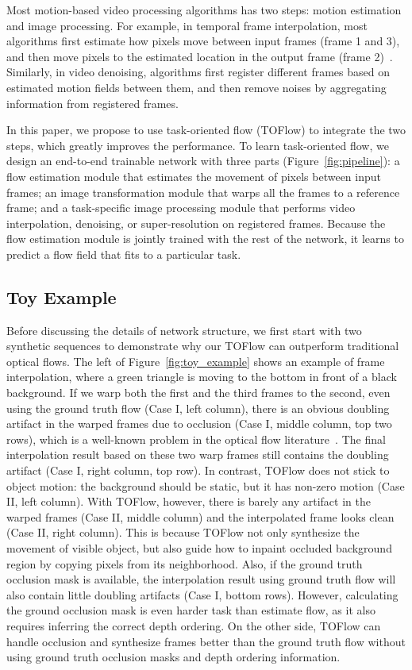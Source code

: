 \documentclass[twocolumn,natbib]{svjour3}          \smartqed  \usepackage{graphicx}
\newcommand{\fig}[1]{Figure~\ref{#1}}
\def\toflow{TOFlow\xspace}
\begin{document}
 
Most motion-based video processing algorithms has two steps: motion estimation and image processing.
For example, in temporal frame interpolation, most algorithms first estimate how pixels move between input frames (frame 1 and 3), and then move pixels to the estimated location in the output frame (frame 2)~\citep{baker2011database}. Similarly, in video denoising, algorithms first register different frames based on estimated motion fields between them, and then remove noises by aggregating information from registered frames.

In this paper, we propose to use task-oriented flow (TOFlow) to integrate the two steps, which greatly improves the performance. To learn task-oriented flow, we design an end-to-end trainable network with three parts (\fig{fig:pipeline}): a flow estimation module that estimates the movement of pixels between input frames; an image transformation module that warps all the frames to a reference frame; and a task-specific image processing module that performs video interpolation, denoising, or super-resolution on registered frames. Because the flow estimation module is jointly trained with the rest of the network, it learns to predict a flow field that fits to a particular task.

\subsection{Toy Example}
\label{sec:toy_exmaple}



Before discussing the details of network structure, we first start with two synthetic sequences to demonstrate why our \toflow can outperform traditional optical flows. The left of \fig{fig:toy_example} shows an example of frame interpolation, where a green triangle is moving to the bottom in front of a black background. If we warp both the first and the third frames to the second, even using the ground truth flow (Case I, left column), there is an obvious doubling artifact in the warped frames due to occlusion (Case I, middle column, top two rows), which is a well-known problem in the optical flow literature~\citep{baker2011database}. The final interpolation result based on these two warp frames still contains the doubling artifact (Case I, right column, top row). In contrast, \toflow does not stick to object motion: the background should be static, but it has non-zero motion (Case II, left column). With \toflow, however, there is barely any artifact in the warped frames (Case II, middle column) and the interpolated frame looks clean (Case II, right column). This is because \toflow not only synthesize the movement of visible object, but also guide how to inpaint occluded background region by copying pixels from its neighborhood. Also, if the ground truth occlusion mask is available, the interpolation result using ground truth flow will also contain little doubling artifacts (Case I, bottom rows). However, calculating the ground occlusion mask is even harder task than estimate flow, as it also requires inferring the correct depth ordering. On the other side, \toflow can handle occlusion and synthesize frames better than the ground truth flow without using ground truth occlusion masks and depth ordering information. 
\end{document}

